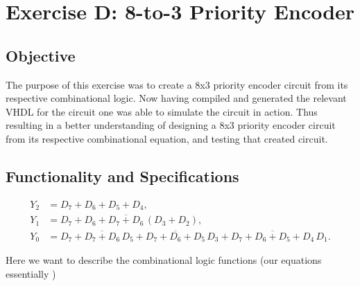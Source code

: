 \documentclass[12pt]{article}
\begin{document}
\section{Exercise D: 8-to-3 Priority Encoder}
\subsection{Objective}
The purpose of this exercise was to create a 8x3 priority encoder circuit from its respective combinational logic. Now having compiled and generated the relevant VHDL for the circuit one was able to simulate the circuit in action. Thus resulting in a better understanding of designing a 8x3 priority encoder circuit from its respective combinational equation, and testing that created circuit.

\subsection{Functionality and Specifications}
\[
\begin{aligned}
Y_2 &= D_7 + D_6 + D_5 + D_4,\\[1mm]
Y_1 &= D_7 + D_6 + \overline{D_7 + D_6}\,(D_3 + D_2),\\[1mm]
Y_0 &= D_7 + \overline{D_7 + D_6}\,D_5 + \overline{D_7 + D_6 + D_5}\,D_3 + \overline{D_7 + D_6 + D_5 + D_4}\,D_1.
\end{aligned}
\]

Here we want to describe the combinational logic functions (our equations essentially )
\end{document}
